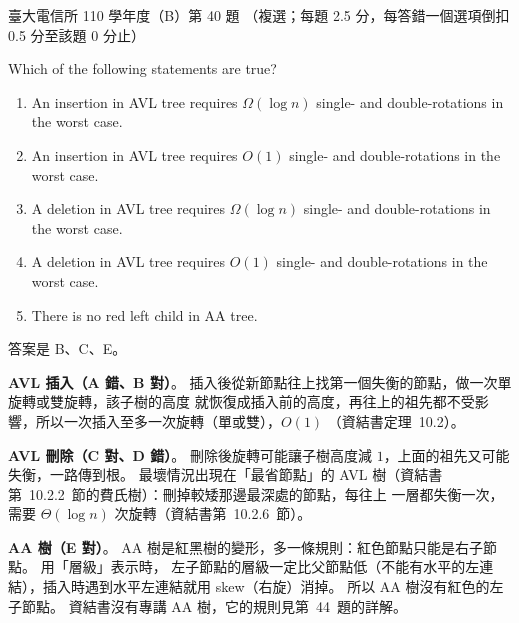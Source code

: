 \begin{pastexam}[label={px:ntu-110-comm-dsa-40}]{臺大電信所 110 學年度（B）第 40 題}
（複選；每題 2.5 分，每答錯一個選項倒扣 0.5 分至該題 0 分止）

Which of the following statements are true?
\begin{enumerate}[label=\Alph*.]
\item An insertion in AVL tree requires $\Omega(\log n)$ single- and double-rotations in the worst case.
\item An insertion in AVL tree requires $O(1)$ single- and double-rotations in the worst case.
\item A deletion in AVL tree requires $\Omega(\log n)$ single- and double-rotations in the worst case.
\item A deletion in AVL tree requires $O(1)$ single- and double-rotations in the worst case.
\item There is no red left child in AA tree.
\end{enumerate}
\end{pastexam}

\begin{pastsoln}
答案是 B、C、E。

\textbf{AVL 插入（A 錯、B 對）}。 插入後從新節點往上找第一個失衡的節點，做一次單旋轉或雙旋轉，該子樹的高度
就恢復成插入前的高度，再往上的祖先都不受影響，所以一次插入至多一次旋轉（單或雙），$O(1)$
（資結書定理~10.2）。

\textbf{AVL 刪除（C 對、D 錯）}。 刪除後旋轉可能讓子樹高度減 $1$，上面的祖先又可能失衡，一路傳到根。
最壞情況出現在「最省節點」的 AVL 樹（資結書第~10.2.2~節的費氏樹）：刪掉較矮那邊最深處的節點，每往上
一層都失衡一次，需要 $\Theta(\log n)$ 次旋轉（資結書第~10.2.6~節）。

\textbf{AA 樹（E 對）}。 AA 樹是紅黑樹的變形，多一條規則：紅色節點只能是右子節點。 用「層級」表示時，
左子節點的層級一定比父節點低（不能有水平的左連結），插入時遇到水平左連結就用 skew（右旋）消掉。
所以 AA 樹沒有紅色的左子節點。 資結書沒有專講 AA 樹，它的規則見第~44~題的詳解。
\end{pastsoln}

